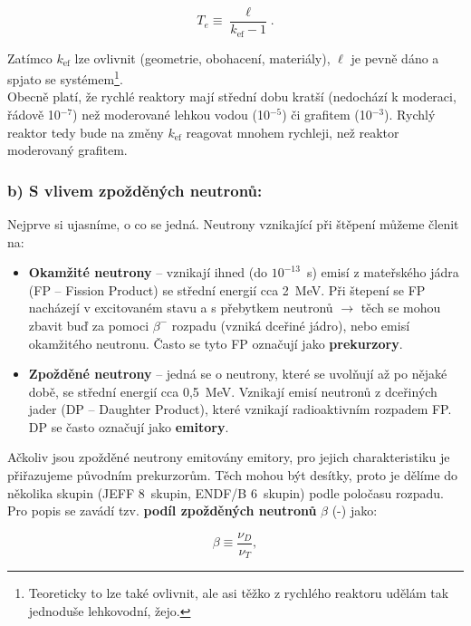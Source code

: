 \begin{equation}
  \boxed{
  T_e \equiv \dfrac{\ell}{k_{\text{ef}} - 1}.
  \label{perioda}}
\end{equation}

Zatímco $k_{\text{ef}}$ lze ovlivnit (geometrie, obohacení, materiály), $\ell$ je pevně dáno a spjato se systémem\footnote{Teoreticky to lze také ovlivnit, ale asi těžko z rychlého reaktoru udělám tak jednoduše lehkovodní, žejo.}.\\

Obecně platí, že rychlé reaktory mají střední dobu kratší (nedochází k moderaci, řádově 10$^{-7}$) než moderované lehkou vodou (10$^{-5}$) či grafitem (10$^{-3}$). Rychlý reaktor tedy bude na změny $k_{\text{ef}}$ reagovat mnohem rychleji, než reaktor moderovaný grafitem.\\

\subsubsection{b) S vlivem zpožděných neutronů:}

Nejprve si ujasníme, o co se jedná. Neutrony vznikající při štěpení můžeme členit na:

\begin{itemize}
  \item \textbf{Okamžité neutrony} -- vznikají ihned (do $10^{-13}$~s) emisí z mateřského jádra (FP -- Fission Product) se střední energií cca 2~MeV. Při štepení se FP nacházejí v excitovaném stavu a s přebytkem neutronů $\rightarrow$ těch se mohou zbavit buď za pomoci $\beta^-$ rozpadu (vzniká dceřiné jádro), nebo emisí okamžitého neutronu. Často se tyto FP označují jako \textbf{prekurzory}.
  \item \textbf{Zpožděné neutrony} -- jedná se o neutrony, které se uvolňují až po nějaké době, se střední energií cca 0,5~MeV. Vznikají emisí neutronů z dceřiných jader (DP -- Daughter Product), které vznikají radioaktivním rozpadem FP. DP se často označují jako \textbf{emitory}.
\end{itemize}

Ačkoliv jsou zpožděné neutrony emitovány emitory, pro jejich charakteristiku je přiřazujeme původním prekurzorům. Těch mohou být desítky, proto je dělíme do několika skupin (JEFF 8~skupin, ENDF/B 6~skupin) podle poločasu rozpadu. Pro popis se zavádí tzv. \textbf{podíl zpožděných neutronů} $\beta$ (-) jako:

\begin{equation}
  \boxed{
  \beta \equiv \dfrac{\nu_D}{\nu_T},
  \label{zpozdenky}}
\end{equation}

